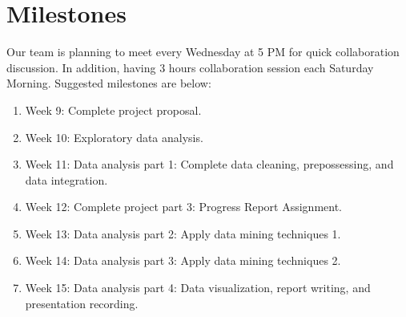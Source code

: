 \documentclass[sigconf,screen,nonacm]{acmart}
\begin{document}
\section{Milestones}
Our team is planning to meet every Wednesday at 5 PM for quick collaboration discussion. In addition, having 3 hours collaboration session each Saturday Morning. Suggested milestones are below:

\begin{enumerate}
\item Week 9: Complete project proposal.
\item Week 10: Exploratory data analysis.
\item Week 11: Data analysis part 1: Complete data cleaning, prepossessing, and data integration.
\item Week 12: Complete project part 3: Progress Report Assignment.
\item Week 13: Data analysis part 2: Apply data mining techniques 1.
\item Week 14: Data analysis part 3: Apply data mining techniques 2.
\item Week 15: Data analysis part 4: Data visualization, report writing, and presentation recording.  
\end{enumerate}




\end{document}
